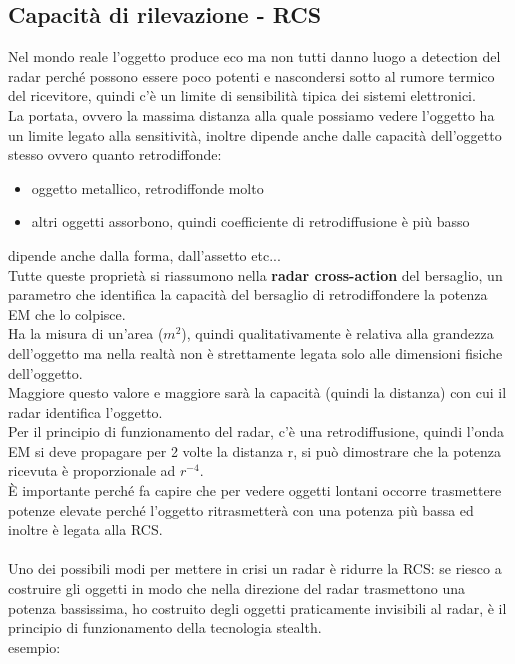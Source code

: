 \documentclass[oneside, 12pt]{extbook}
\begin{document}
\subsection{Capacità di rilevazione - RCS}
Nel mondo reale l'oggetto produce eco ma non tutti danno luogo a detection del radar perché possono essere poco potenti e nascondersi sotto al rumore termico del ricevitore, quindi c'è un limite di sensibilità tipica dei sistemi elettronici.\\
La portata, ovvero la massima distanza alla quale possiamo vedere l'oggetto ha un limite legato alla sensitività, inoltre dipende anche dalle capacità dell'oggetto stesso ovvero quanto retrodiffonde:
\begin{itemize}
	\item oggetto metallico, retrodiffonde molto
	\item altri oggetti assorbono, quindi coefficiente di retrodiffusione è più basso
\end{itemize}
dipende anche dalla forma, dall'assetto etc...\\
Tutte queste proprietà si riassumono nella \textbf{radar cross-action} del bersaglio, un parametro che identifica la capacità del bersaglio di retrodiffondere la potenza EM che lo colpisce.\\
Ha la misura di un'area ($m^2$), quindi qualitativamente è relativa alla grandezza dell'oggetto ma nella realtà non è strettamente legata solo alle dimensioni fisiche dell'oggetto.\\
Maggiore questo valore e maggiore sarà la capacità (quindi la distanza) con cui il radar identifica l'oggetto.\\
Per il principio di funzionamento del radar, c'è una retrodiffusione, quindi l'onda EM si deve propagare per 2 volte la distanza r, si può dimostrare che la potenza ricevuta è proporzionale ad $r^{-4}$.\\
È importante perché fa capire che per vedere oggetti lontani occorre trasmettere potenze elevate perché l'oggetto ritrasmetterà con una potenza più bassa ed inoltre è legata alla RCS.\\\\
Uno dei possibili modi per mettere in crisi un radar è ridurre la RCS: se riesco a costruire gli oggetti in modo che nella direzione del radar trasmettono una potenza bassissima, ho costruito degli oggetti praticamente invisibili al radar, è il principio di funzionamento della tecnologia stealth.\\
esempio:\\
\end{document}
